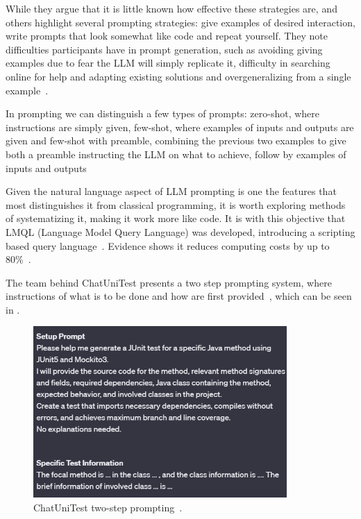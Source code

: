 While they argue that it is little known how effective these strategies are, \citet{kn:johnny} and others highlight several prompting strategies: give examples of desired interaction, write prompts that look somewhat like code and repeat yourself. They note difficulties participants have in prompt generation, such as avoiding giving examples due to fear the LLM will simply replicate it, difficulty in searching online for help and adapting existing solutions and overgeneralizing from a single example~\cite{kn:johnny}.

In prompting we can distinguish a few types of prompts: zero-shot, where instructions are simply given, few-shot, where examples of inputs and outputs are given and few-shot with preamble, combining the previous two examples to give both a preamble instructing the LLM on what to achieve, follow by examples of inputs and outputs~\cite{kn:promptprofiannaca}

Given the natural language aspect of LLM prompting is one the features that most distinguishes it from classical programming, it is worth exploring methods of systematizing it, making it work more like code. It is with this objective that LMQL (Language Model Query Language) was developed, introducing a scripting based query language~\cite{kn:lmql}. Evidence shows it reduces computing costs by up to 80\%~\cite{kn:lmql}.

The team behind ChatUniTest presents a two step prompting system, where instructions of what is to be done and how are first provided~\cite{kn:chatunitest}, which can be seen in .

\begin{figure}
    \centering
    \includegraphics[width=0.86\textwidth]{figures/chatunittestprompt.png}
    \caption{ChatUniTest two-step prompting~\cite{kn:chatunitest}.}
    \label{fig:chunit}
\end{figure}


